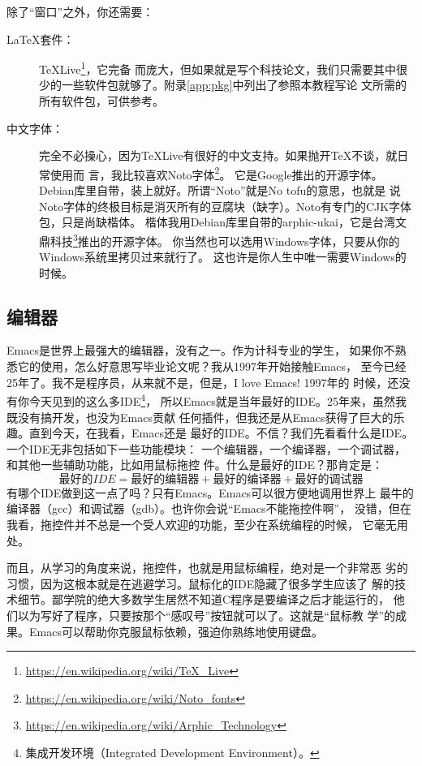 除了“窗口”之外，你还需要：
\begin{description}
\item[\LaTeX{}套件：] TeXLive\footnote{\url{https://en.wikipedia.org/wiki/TeX_Live}}，它完备
  而庞大，但如果就是写个科技论文，我们只需要其中很少的一些软件包就够了。附录\ref{app:pkg}中列出了参照本教程写论
  文所需的所有软件包，可供参考。
\item[中文字体：] 完全不必操心，因为TeXLive有很好的中文支持。如果抛开\TeX{}不谈，就日常使用而
  言，我比较喜欢Noto字体\footnote{\url{https://en.wikipedia.org/wiki/Noto_fonts}}。
  它是Google推出的开源字体。Debian库里自带，装上就好。所谓“Noto”就是No tofu的意思，也就是
  说Noto字体的终极目标是消灭所有的豆腐块（缺字）。Noto有专门的CJK字体包，只是尚缺楷体。%
  楷体我用Debian库里自带的arphic-ukai，它是台湾文鼎科技\footnote{%
    \url{https://en.wikipedia.org/wiki/Arphic_Technology}}推出的开源字体。
  你当然也可以选用Windows字体，只要从你的Windows系统里拷贝过来就行了。
  这也许是你人生中唯一需要Windows的时候。
\end{description}

\subsection{编辑器}
\label{sec:emacs}

Emacs是世界上最强大的编辑器\cite{emacs}，没有之一。作为计科专业的学生，
如果你不熟悉它的使用，怎么好意思写毕业论文呢？我从1997年开始接触Emacs，
至今已经25年了。我不是程序员，从来就不是，但是，I love Emacs! 1997年的
时候，还没有你今天见到的这么多IDE\footnote{集成开发环境（Integrated
  Development Environment）。}，%
所以Emacs就是当年最好的IDE。25年来，虽然我既没有搞开发，也没为Emacs贡献
任何插件，但我还是从Emacs获得了巨大的乐趣。直到今天，在我看，Emacs还是
最好的IDE。不信？我们先看看什么是IDE。一个IDE无非包括如下一些功能模块：
一个编辑器，一个编译器，一个调试器，和其他一些辅助功能，比如用鼠标拖控
件。什么是最好的IDE？那肯定是：
\[
  最好的IDE = 最好的编辑器 + 最好的编译器 + 最好的调试器
\]
有哪个IDE做到这一点了吗？只有Emacs。Emacs可以很方便地调用世界上
最牛的编译器（gcc）和调试器（gdb）。也许你会说“Emacs不能拖控件啊”，
没错，但在我看，拖控件并不总是一个受人欢迎的功能，至少在系统编程的时候，
它毫无用处。

而且，从学习的角度来说，拖控件，也就是用鼠标编程，绝对是一个非常恶
劣的习惯，因为这根本就是在逃避学习。鼠标化的IDE隐藏了很多学生应该了
解的技术细节。鄙学院的绝大多数学生居然不知道C程序是要编译之后才能运行的，
他们以为写好了程序，只要按那个“感叹号”按钮就可以了。这就是“鼠标教
学”的成果。Emacs可以帮助你克服鼠标依赖，强迫你熟练地使用键盘。

